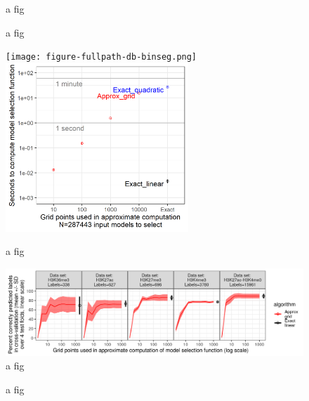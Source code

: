 \documentclass{article}
\begin{document}
\begin{figure}
  \centering
  
  \caption{a fig}
\end{figure}

\begin{figure}
  \centering
  
  \caption{a fig}
\end{figure}

\begin{figure}
  \centering
   \texttt{[image: figure-fullpath-db-binseg.png]}
   \includegraphics[height=2.5in]{figure-fullpath-grid-timing.png}  
  \caption{a fig}
\end{figure}

\begin{figure}
  \centering
  \includegraphics[width=\textwidth]{figure-chipseq-cv}
  \caption{a fig}
\end{figure}

\begin{figure}
  \centering
    
  \caption{a fig}
\end{figure}
\end{document}
